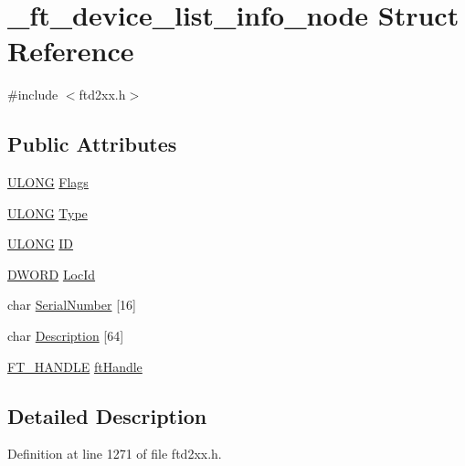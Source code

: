 \hypertarget{struct__ft__device__list__info__node}{
\section{\_\-ft\_\-device\_\-list\_\-info\_\-node Struct Reference}
\label{struct__ft__device__list__info__node}
}


{\ttfamily \#include $<$ftd2xx.h$>$}\subsection*{Public Attributes}
\begin{DoxyCompactItemize}
\item 
\hyperlink{LALUsbx64_2include_2WinTypes_8h_af632da489ebc3708ec3ab6791ee53fa4}{ULONG} \hyperlink{struct__ft__device__list__info__node_a721b47fa89702eff50b231f17c4298e6}{Flags}
\item 
\hyperlink{LALUsbx64_2include_2WinTypes_8h_af632da489ebc3708ec3ab6791ee53fa4}{ULONG} \hyperlink{struct__ft__device__list__info__node_aa764a1406eb904ad4444a82f2f950b4e}{Type}
\item 
\hyperlink{LALUsbx64_2include_2WinTypes_8h_af632da489ebc3708ec3ab6791ee53fa4}{ULONG} \hyperlink{struct__ft__device__list__info__node_a6f486d775e8b49190ec48e99cdbdcbe5}{ID}
\item 
\hyperlink{LALUsbx64_2include_2WinTypes_8h_ad342ac907eb044443153a22f964bf0af}{DWORD} \hyperlink{struct__ft__device__list__info__node_a11f8898a6bc9a91abadb14c02cac4394}{LocId}
\item 
char \hyperlink{struct__ft__device__list__info__node_a833aa1d16c8e1034840397921ae92413}{SerialNumber} \mbox{[}16\mbox{]}
\item 
char \hyperlink{struct__ft__device__list__info__node_a2ed17bec72cbe5e73a2e83cd29a8e681}{Description} \mbox{[}64\mbox{]}
\item 
\hyperlink{LALUsbx64_2include_2ftd2xx_8h_a9f2476fd3ad0ddfc6159f75bfb2910a0}{FT\_\-HANDLE} \hyperlink{struct__ft__device__list__info__node_a3a26fc5e6180c4f87dec4ebf1951d100}{ftHandle}
\end{DoxyCompactItemize}


\subsection{Detailed Description}


Definition at line 1271 of file ftd2xx.h.

